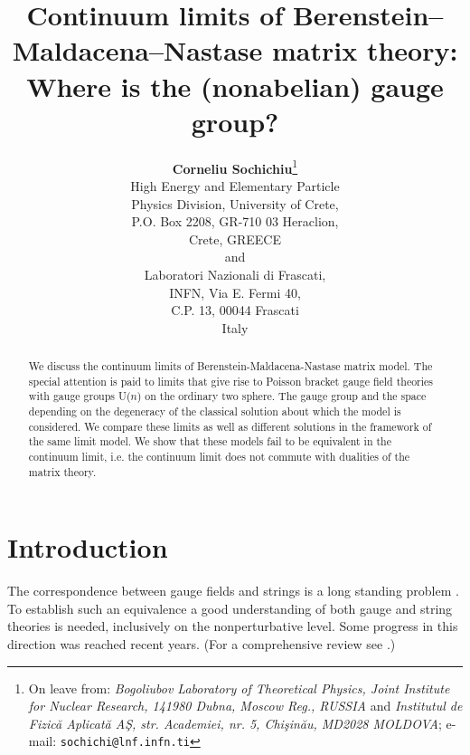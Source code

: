 \documentclass[a4paper]{article}
\begin{document}
\title{Continuum limits of Berenstein--Maldacena--Nastase matrix theory: Where is the
(nonabelian) gauge group?}

\author{\textbf{Corneliu Sochichiu}\thanks{
On leave from: \textit{Bogoliubov Laboratory of Theoretical
Physics, Joint Institute for Nuclear Research, 141980 Dubna,
Moscow Reg., RUSSIA} and \textit{Institutul de Fizic\u a Aplicat\u
a A\c S, str. Academiei, nr. 5, Chi\c sin\u au, MD2028 MOLDOVA};
e-mail: \texttt{sochichi@lnf.infn.ti}}\\
High Energy and Elementary Particle\\
Physics Division,
University of Crete,\\
P.O. Box 2208, GR-710 03 Heraclion,\\ Crete,
GREECE\\
and\\
Laboratori Nazionali di Frascati,\\
INFN, Via E. Fermi 40,\\
C.P. 13, 00044 Frascati\\
Italy
}


\maketitle
\begin{abstract}
We discuss the continuum limits of Berenstein-Maldacena-Nastase
matrix model. The special attention is paid to limits that give
rise to Poisson bracket gauge field theories with gauge groups
U($n$) on the ordinary two sphere. The gauge group and the space
depending on the degeneracy of the classical solution about which
the model is considered. We compare these limits as well as
different solutions in the framework of the same limit model. We
show that these models fail to be equivalent in the continuum
limit, i.e. the continuum limit does not commute with dualities of
the matrix theory.
\end{abstract}






\section{Introduction}
The correspondence between gauge fields and strings is a long
standing problem \cite{'tHooft:1974jz}. To establish such an
equivalence a good understanding of both gauge and string theories
is needed, inclusively on the nonperturbative level. Some progress
in this direction was reached recent years. (For a comprehensive
review see \cite{Aharony:1999ti}.)
\end{document}
